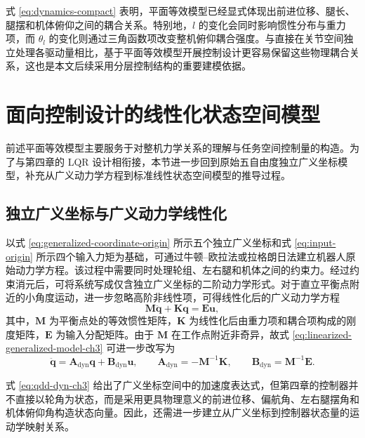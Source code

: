 式 \eqref{eq:dynamics-compact} 表明，平面等效模型已经显式体现出前进位移、腿长、腿摆和机体俯仰之间的耦合关系。特别地，$l$ 的变化会同时影响惯性分布与重力项，而 $\theta_l$ 的变化则通过三角函数项改变整机俯仰耦合强度。与直接在关节空间独立处理各驱动量相比，基于平面等效模型开展控制设计更容易保留这些物理耦合关系，这也是本文后续采用分层控制结构的重要建模依据。

\section{面向控制设计的线性化状态空间模型}\label{sec:state-space-model}

前述平面等效模型主要服务于对整机力学关系的理解与任务空间控制量的构造。为了与第四章的 LQR 设计相衔接，本节进一步回到原始五自由度独立广义坐标模型，补充从广义动力学方程到标准线性状态空间模型的推导过程。

\subsection{独立广义坐标与广义动力学线性化}

以式 \eqref{eq:generalized-coordinate-origin} 所示五个独立广义坐标和式 \eqref{eq:input-origin} 所示四个输入力矩为基础，可通过牛顿--欧拉法或拉格朗日法建立机器人原始动力学方程。该过程中需要同时处理轮组、左右腿和机体之间的约束力。经过约束消元后，可将系统写成仅含独立广义坐标的二阶动力学形式。对于直立平衡点附近的小角度运动，进一步忽略高阶非线性项，可得线性化后的广义动力学方程
\begin{equation}
  \boldsymbol{M}\ddot{\boldsymbol{q}} + \boldsymbol{K}\boldsymbol{q} = \boldsymbol{E}\boldsymbol{u},
  \label{eq:linearized-generalized-model-ch3}
\end{equation}
其中，$\boldsymbol{M}$ 为平衡点处的等效惯性矩阵，$\boldsymbol{K}$ 为线性化后由重力项和耦合项构成的刚度矩阵，$\boldsymbol{E}$ 为输入分配矩阵。由于 $\boldsymbol{M}$ 在工作点附近非奇异，故式 \eqref{eq:linearized-generalized-model-ch3} 可进一步改写为
\begin{equation}
  \ddot{\boldsymbol{q}}
  =
  \boldsymbol{A}_{\mathrm{dyn}}\boldsymbol{q}
  +
  \boldsymbol{B}_{\mathrm{dyn}}\boldsymbol{u},
  \qquad
  \boldsymbol{A}_{\mathrm{dyn}} = -\boldsymbol{M}^{-1}\boldsymbol{K},
  \qquad
  \boldsymbol{B}_{\mathrm{dyn}} = \boldsymbol{M}^{-1}\boldsymbol{E}.
  \label{eq:qdd-dyn-ch3}
\end{equation}

式 \eqref{eq:qdd-dyn-ch3} 给出了广义坐标空间中的加速度表达式，但第四章的控制器并不直接以轮角为状态，而是采用更具物理意义的前进位移、偏航角、左右腿摆角和机体俯仰角构造状态向量。因此，还需进一步建立从广义坐标到控制器状态量的运动学映射关系。

